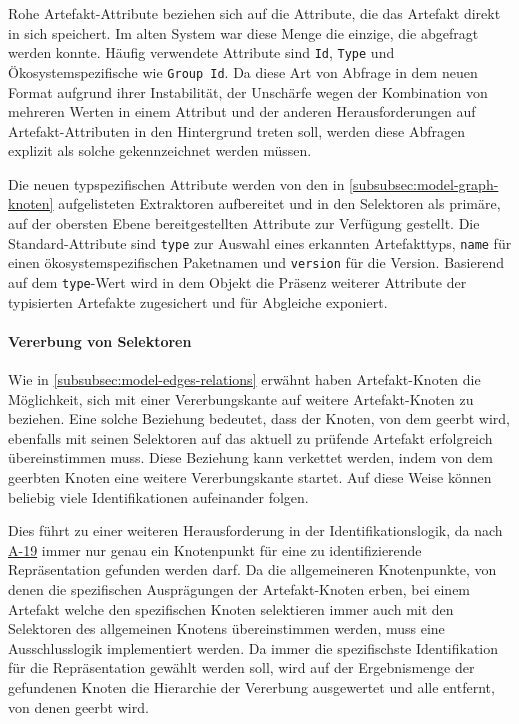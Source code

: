 Rohe Artefakt-Attribute beziehen sich auf die Attribute, die das Artefakt direkt in sich speichert.
Im alten System war diese Menge die einzige, die abgefragt werden konnte.
Häufig verwendete Attribute sind \texttt{Id}, \texttt{Type} und Ökosystemspezifische wie \texttt{Group Id}.
Da diese Art von Abfrage in dem neuen Format aufgrund ihrer Instabilität, der Unschärfe wegen der Kombination von mehreren Werten in einem Attribut und der anderen Herausforderungen auf Artefakt-Attributen in den Hintergrund treten soll, werden diese Abfragen explizit als solche gekennzeichnet werden müssen.

Die neuen typspezifischen Attribute werden von den in \autoref{subsubsec:model-graph-knoten} aufgelisteten Extraktoren aufbereitet und in den Selektoren als primäre, auf der obersten Ebene bereitgestellten Attribute zur Verfügung gestellt.
Die Standard-Attribute sind \texttt{type} zur Auswahl eines erkannten Artefakttyps, \texttt{name} für einen ökosystemspezifischen Paketnamen und \texttt{version} für die Version.
Basierend auf dem \texttt{type}-Wert wird in dem Objekt die Präsenz weiterer Attribute der typisierten Artefakte zugesichert und für Abgleiche exponiert.

\paragraph{Vererbung von Selektoren}

Wie in \autoref{subsubsec:model-edges-relations} erwähnt haben Artefakt-Knoten die Möglichkeit, sich mit einer Vererbungskante auf weitere Artefakt-Knoten zu beziehen.
Eine solche Beziehung bedeutet, dass der Knoten, von dem geerbt wird, ebenfalls mit seinen Selektoren auf das aktuell zu prüfende Artefakt erfolgreich übereinstimmen muss.
Diese Beziehung kann verkettet werden, indem von dem geerbten Knoten eine weitere Vererbungskante startet.
Auf diese Weise können beliebig viele Identifikationen aufeinander folgen.

Dies führt zu einer weiteren Herausforderung in der Identifikationslogik, da nach \hyperref[subsec:req-graph-inner-consistency]{A-19} immer nur genau ein Knotenpunkt für eine zu identifizierende Repräsentation gefunden werden darf.
Da die allgemeineren Knotenpunkte, von denen die spezifischen Ausprägungen der Artefakt-Knoten erben, bei einem Artefakt welche den spezifischen Knoten selektieren immer auch mit den Selektoren des allgemeinen Knotens übereinstimmen werden, muss eine Ausschlusslogik implementiert werden.
Da immer die spezifischste Identifikation für die Repräsentation gewählt werden soll, wird auf der Ergebnismenge der gefundenen Knoten die Hierarchie der Vererbung ausgewertet und alle entfernt, von denen geerbt wird.

